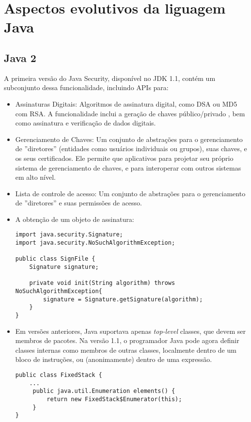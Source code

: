 \section {Aspectos evolutivos da liguagem Java}
		\subsection {Java 2}
			A primeira versão do Java Security, disponível no JDK 1.1\cite{JDK1.1}, contém um subconjunto dessa funcionalidade, incluindo APIs para:
		  \begin{itemize}
			  \item Assinaturas Digitais: Algoritmos de assinatura digital, como DSA ou MD5 com RSA. A funcionalidade inclui a geração de chaves público/privado , bem como assinatura e verificação de dados digitais.
			  \item Gerenciamento de Chaves: Um conjunto de abstrações para o gerenciamento de ''diretores'' (entidades como usuários individuais ou grupos), suas chaves, e os seus certificados. Ele permite que aplicativos para projetar seu próprio sistema de gerenciamento de chaves, e para interoperar com outros sistemas em alto nível.
			  \item Lista de controle de acesso: Um conjunto de abstrações para o gerenciamento de ''diretores'' e suas permissões de acesso.
			  \item A obtenção de um objeto de assinatura: 
			  
\begin{lstlisting}
import java.security.Signature;
import java.security.NoSuchAlgorithmException;
	
public class SignFile {
	Signature signature;
		
	private void init(String algorithm) throws NoSuchAlgorithmException{
		signature = Signature.getSignature(algorithm);
    }
}
\end{lstlisting}
			  
			  \item Em versões anteriores, Java suportava apenas {\it top-level} classes, que devem ser membros de pacotes. Na versão 1.1, o programador Java pode agora definir classes internas como membros de outras classes\cite{bracha1998gj}, localmente dentro de um bloco de instruções, ou (anonimamente) dentro de uma expressão.
		  
\begin{lstlisting}
public class FixedStack {
	...
	 public java.util.Enumeration elements() {
	     return new FixedStack$Enumerator(this);
	 }
}
		

\end{lstlisting}
\end{itemize}
